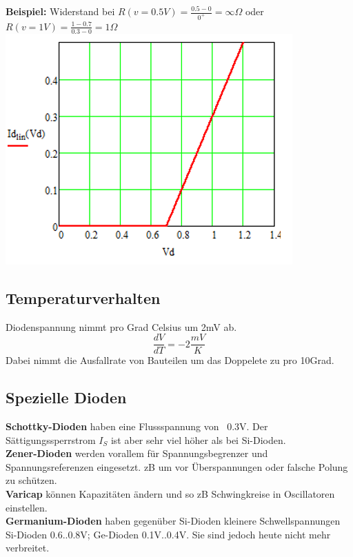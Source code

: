 \textbf{Beispiel:} Widerstand bei $R(v = 0.5V) = \frac{0.5 - 0}{0^+} = \infty\Omega$ oder $R(v = 1V) = \frac{1 - 0.7}{0.3 - 0} = 1\Omega$\\
\includegraphics[width=0.4\columnwidth]{Images/diodenkennlinie}

\subsection{Temperaturverhalten}
Diodenspannung nimmt pro Grad Celsius um 2mV ab. 
\[\frac{dV}{dT} = -2\frac{mV}{K}\]
Dabei nimmt die Ausfallrate von Bauteilen um das Doppelete zu pro 10Grad.

\subsection{Spezielle Dioden}
\noindent\textbf{Schottky-Dioden} haben eine Flussspannung von ~0.3V. Der Sättigungssperrstrom $I_S$ ist aber sehr viel höher als bei Si-Dioden.~\\
\noindent\textbf{Zener-Dioden} werden vorallem für Spannungsbegrenzer und Spannungsreferenzen eingesetzt. zB um vor Überspannungen oder falsche Polung zu schützen.~\\
\noindent\textbf{Varicap} können Kapazitäten ändern und so zB Schwingkreise in Oscillatoren einstellen.~\\
\noindent\textbf{Germanium-Dioden} haben gegenüber Si-Dioden kleinere Schwellspannungen Si-Dioden 0.6..0.8V; Ge-Dioden 0.1V..0.4V. Sie sind jedoch heute nicht mehr verbreitet.



